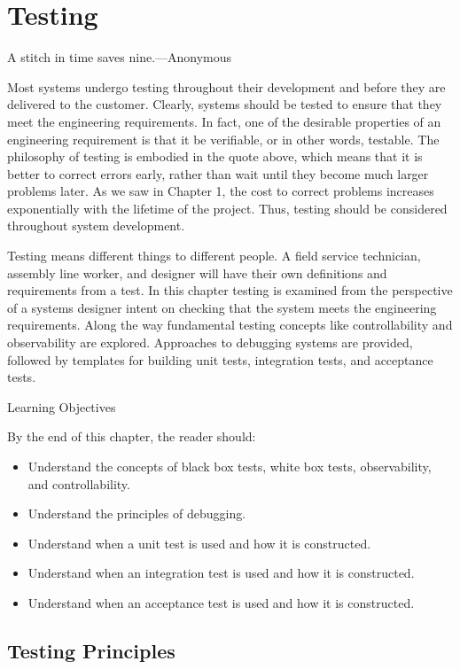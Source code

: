 \section{Testing}\label{testing}

A stitch in time saves nine.---Anonymous

Most systems undergo testing throughout their development and before
they are delivered to the customer. Clearly, systems should be tested to
ensure that they meet the engineering requirements. In fact, one of the
desirable properties of an engineering requirement is that it be
verifiable, or in other words, testable. The philosophy of testing is
embodied in the quote above, which means that it is better to correct
errors early, rather than wait until they become much larger problems
later. As we saw in Chapter 1, the cost to correct problems increases
exponentially with the lifetime of the project. Thus, testing should be
considered throughout system development.

Testing means different things to different people. A field service
technician, assembly line worker, and designer will have their own
definitions and requirements from a test. In this chapter testing is
examined from the perspective of a systems designer intent on checking
that the system meets the engineering requirements. Along the way
fundamental testing concepts like controllability and observability are
explored. Approaches to debugging systems are provided, followed by
templates for building unit tests, integration tests, and acceptance
tests.

Learning Objectives

By the end of this chapter, the reader should:

\begin{itemize}
\item
  Understand the concepts of black box tests, white box tests,
  observability, and controllability.
\item
  Understand the principles of debugging.
\item
  Understand when a unit test is used and how it is constructed.
\item
  Understand when an integration test is used and how it is constructed.
\item
  Understand when an acceptance test is used and how it is constructed.
\end{itemize}

\subsection{Testing Principles}\label{testing-principles}

